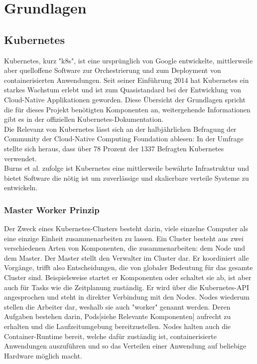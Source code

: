 \documentclass[a4paper,10pt]{scrartcl}
\begin{document}
\pagebreak

\section{Grundlagen}
\subsection{Kubernetes}

Kubernetes, kurz "k8s", ist eine ursprünglich von Google entwickelte, mittlerweile aber quelloffene Software zur Orchestrierung und zum Deployment von containerisierten Anwendungen. Seit seiner Einführung 2014 hat Kubernetes ein starkes Wachstum erlebt und ist zum Quasistandard bei der Entwicklung von Cloud-Native Applikationen geworden.
Diese Übersicht der Grundlagen spricht die für dieses Projekt benötigten Komponenten an, weitergehende Informationen gibt es in der offiziellen Kubernetes-Dokumentation. \cite{components}\\

\glqq Die Relevanz von Kubernetes lässt sich an der halbjährlichen Befragung der Community der Cloud-Native Computing Foundation ablesen:
In der Umfrage stellte sich heraus, dass über 78 Prozent der 1337 Befragten Kubernetes verwendet.\grqq \cite{cncf2019}\\

Burns et al. zufolge ist Kubernetes eine mittlerweile bewährte Infrastruktur und bietet Software die nötig ist um zuverlässige und skalierbare verteile Systeme zu entwickeln. \cite{Burns} \\
\subsubsection{Master Worker Prinzip}
Der Zweck eines Kubernetes-Clusters besteht darin, viele einzelne Computer als eine einzige Einheit zusammenarbeiten zu lassen.
Ein Cluster besteht aus zwei verschiedenen Arten von Komponenten, die zusammenarbeiten:
dem Node und dem Master.
Der Master stellt den Verwalter im Cluster dar. Er koordiniert alle Vorgänge, trifft also Entscheidungen, die von globaler Bedeutung für das gesamte Cluster sind. Beispielsweise startet er Komponenten oder schaltet sie ab, ist aber auch für Tasks wie die Zeitplanung zuständig. Er wird über die Kubernetes-API angesprochen und steht in direkter Verbindung mit den Nodes.
Nodes wiederum stellen die Arbeiter dar, weshalb sie auch "worker" genannt werden. Deren Aufgaben bestehen darin, Pods[siehe Relevante Komponenten] aufrecht zu erhalten und die Laufzeitumgebung bereitzustellen. Nodes halten auch die Container-Runtime bereit, welche dafür zuständig ist, containerisierte Anwendungen auszuführen und so das Verteilen einer Anwendung auf beliebige Hardware möglich macht.
\end{document}
